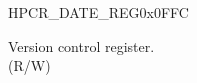 \begin{register}{H}{PCR\_DATE\_REG}{0x0FFC}\label{regdesc:PCRDATEREG}
%
%
\regnewline%
\begin{regdesc}\begin{reglist}
\label{fielddesc:PCRDATE}\item [PCR\_DATE] Version control register. \\ (R/W)
\end{reglist}\end{regdesc}
\end{register}
